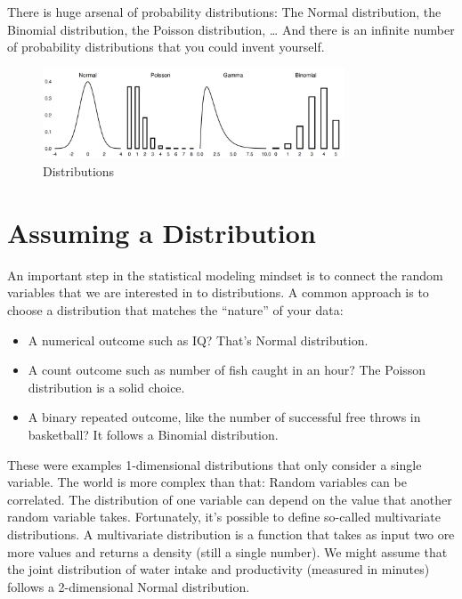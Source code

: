 \documentclass[
  10pt,
]{scrbook}
\providecommand{\tightlist}{%
  \setlength{\itemsep}{0pt}\setlength{\parskip}{0pt}}
\begin{document}
There is huge arsenal of probability distributions: The Normal distribution, the Binomial distribution, the Poisson distribution, \ldots{}
And there is an infinite number of probability distributions that you could invent yourself.

\begin{figure}

{\centering \includegraphics[width=0.8\textwidth]{figures/distributions-1} 

}

\caption{Distributions}\label{fig:distributions}
\end{figure}

\hypertarget{assuming-a-distribution}{%
\section{Assuming a Distribution}\label{assuming-a-distribution}}

An important step in the statistical modeling mindset is to connect the random variables that we are interested in to distributions.
A common approach is to choose a distribution that matches the ``nature'' of your data:

\begin{itemize}
\tightlist
\item
  A numerical outcome such as IQ? That's Normal distribution.
\item
  A count outcome such as number of fish caught in an hour? The Poisson distribution is a solid choice.
\item
  A binary repeated outcome, like the number of successful free throws in basketball? It follows a Binomial distribution.
\end{itemize}

These were examples 1-dimensional distributions that only consider a single variable.
The world is more complex than that:
Random variables can be correlated.
The distribution of one variable can depend on the value that another random variable takes.
Fortunately, it's possible to define so-called multivariate distributions.
A multivariate distribution is a function that takes as input two ore more values and returns a density (still a single number).
We might assume that the joint distribution of water intake and productivity (measured in minutes) follows a 2-dimensional Normal distribution.
\end{document}
